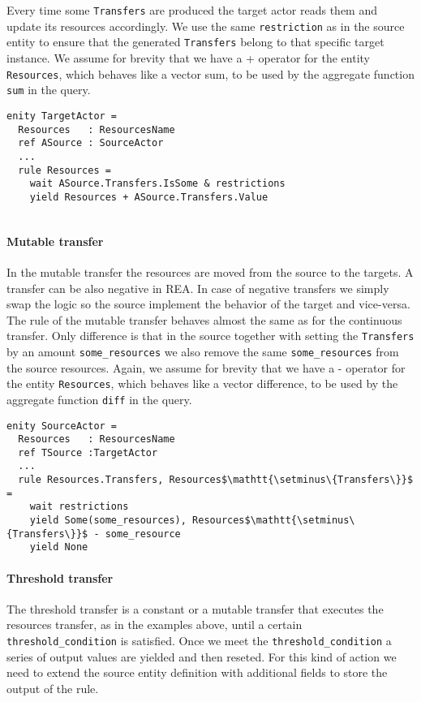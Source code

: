 Every time some \texttt{Transfers} are produced the target actor reads them and update its resources accordingly. We use the same \texttt{restriction} as in the source entity to ensure that the generated \texttt{Transfers} belong to that specific target instance. We assume for brevity that we have a + operator for the entity \texttt{Resources}, which behaves like a vector sum, to be used by the aggregate function \texttt{sum} in the query.

\begin{lstlisting}[mathescape]
enity TargetActor =
  Resources   : ResourcesName
  ref ASource : SourceActor
  ...
  rule Resources =
    wait ASource.Transfers.IsSome & restrictions
    yield Resources + ASource.Transfers.Value
   
\end{lstlisting}


\paragraph*{Mutable transfer}
In the mutable transfer the resources are moved from the source to the targets. A transfer can be also negative in REA. In case of negative transfers we simply swap the logic so the source implement the behavior of the target and vice-versa. The rule of the mutable transfer behaves almost the same as for the continuous transfer. Only difference is that in the source together with setting the \texttt{Transfers} by an amount \texttt{some\_resources} we also remove the same \texttt{some\_resources} from the source resources. Again, we assume for brevity that we have a - operator for the entity \texttt{Resources}, which behaves like a vector difference, to be used by the aggregate function \texttt{diff} in the query. 

\begin{lstlisting}[mathescape]
enity SourceActor =
  Resources   : ResourcesName
  ref TSource :TargetActor
  ...
  rule Resources.Transfers, Resources$\mathtt{\setminus\{Transfers\}}$ = 
    wait restrictions
    yield Some(some_resources), Resources$\mathtt{\setminus\{Transfers\}}$ - some_resource
    yield None
\end{lstlisting}

\paragraph*{Threshold transfer}
The threshold transfer is a constant or a mutable transfer that executes the resources transfer, as in the examples above, until a certain \texttt{threshold\_condition} is satisfied. Once we meet the \texttt{threshold\_condition} a series of output values are yielded and then reseted. For this kind of action we need to extend the source entity definition with additional fields to store the output of the rule.

